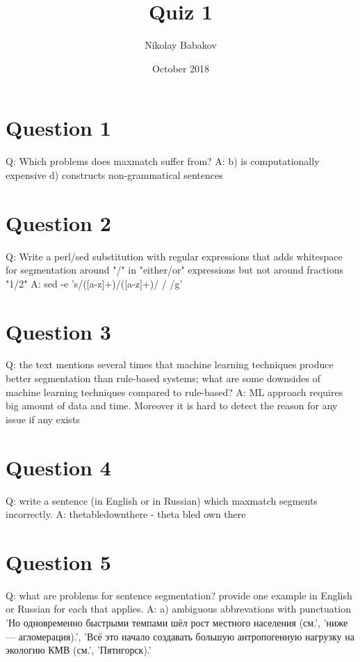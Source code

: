 \documentclass{article}
\title{Quiz 1}
\author{Nikolay Babakov}
\date{October 2018}
\begin{document}
\maketitle

\section{Question 1}
Q: Which problems does maxmatch suffer from?\newline
A: b) is computationally expensive
d) constructs non-grammatical sentences

\section{Question 2}
Q: Write a perl/sed substitution with regular expressions that adds whitespace for segmentation around "/" in "either/or" expressions but not around fractions "1/2"\newline
A: sed -e 's/([a-z]+)/([a-z]+)/\1 / \2/g'

\section{Question 3}
Q: the text mentions several times that machine learning techniques produce better segmentation than rule-based systems; what are some downsides of machine learning techniques compared to rule-based?\newline
A: ML approach requires big amount of data and time. Moreover it is hard to detect the reason for any issue if any exists

\section{Question 4}
Q: write a sentence (in English or in Russian) which maxmatch segments incorrectly.\newline
A: thetabledownthere - theta bled own there

\section{Question 5}
Q: what are problems for sentence segmentation? provide one example in English or Russian for each that applies.\newline
A: a) ambiguous abbrevations with punctuation\newline
'Но одновременно быстрыми темпами шёл рост местного населения (см.',\newline
'ниже— агломерация).',\newline
'Всё это начало создавать большую антропогенную нагрузку на экологию КМВ (см.', 'Пятигорск).'\newline
\end{document}

